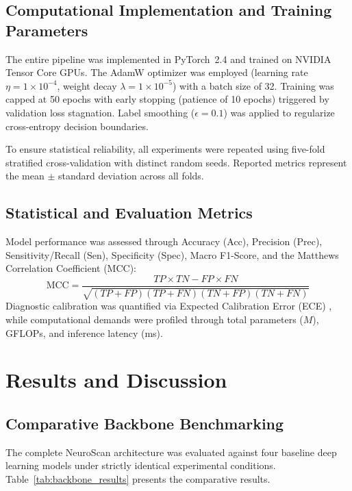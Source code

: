 \documentclass[conference]{IEEEtran}
\begin{document}
\subsection{Computational Implementation and Training Parameters}
The entire pipeline was implemented in PyTorch~2.4 and trained on NVIDIA Tensor Core GPUs. The AdamW optimizer was employed (learning rate $\eta = 1 \times 10^{-4}$, weight decay $\lambda = 1 \times 10^{-5}$) with a batch size of 32. Training was capped at 50 epochs with early stopping (patience of 10 epochs) triggered by validation loss stagnation. Label smoothing ($\epsilon = 0.1$) was applied to regularize cross-entropy decision boundaries.

To ensure statistical reliability, all experiments were repeated using five-fold stratified cross-validation with distinct random seeds. Reported metrics represent the mean $\pm$ standard deviation across all folds.

\subsection{Statistical and Evaluation Metrics}
Model performance was assessed through Accuracy (Acc), Precision (Prec), Sensitivity/Recall (Sen), Specificity (Spec), Macro F1-Score, and the Matthews Correlation Coefficient (MCC):
\begin{equation}
\text{MCC} = \frac{TP \times TN - FP \times FN}{\sqrt{(TP+FP)(TP+FN)(TN+FP)(TN+FN)}}
\end{equation}
Diagnostic calibration was quantified via Expected Calibration Error (ECE) \cite{b13}, while computational demands were profiled through total parameters ($M$), GFLOPs, and inference latency (ms).

\section{Results and Discussion}

\subsection{Comparative Backbone Benchmarking}
The complete NeuroScan architecture was evaluated against four baseline deep learning models under strictly identical experimental conditions. Table~\ref{tab:backbone_results} presents the comparative results.
\end{document}

